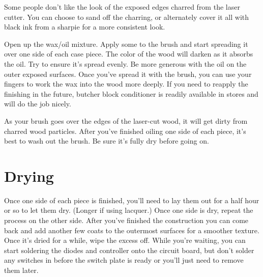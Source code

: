 \documentclass{article}
\begin{document}
\vspace{1em}

Some people don't like the look of the exposed edges charred from the
laser cutter. You can choose to sand off the charring, or alternately
cover it all with black ink from a sharpie for a more consistent look.

\vspace{1em}

Open up the wax/oil mixture. Apply some to the brush and start
spreading it over one side of each case piece. The color of the wood
will darken as it absorbs the oil. Try to ensure it's spread
evenly. Be more generous with the oil on the outer exposed
surfaces. Once you've spread it with the brush, you can use your
fingers to work the wax into the wood more deeply. If you need to
reapply the finishing in the future, butcher block conditioner is
readily available in stores and will do the job nicely.

\vspace{1em}
\noindent{}
\vspace{1em}

As your brush goes over the edges of the laser-cut wood, it will get
dirty from charred wood particles. After you've finished oiling one
side of each piece, it's best to wash out the brush. Be sure it's
fully dry before going on.

\section{Drying}

Once one side of each piece is finished, you'll need to lay them out
for a half hour or so to let them dry. (Longer if using lacquer.) Once
one side is dry, repeat the process on the other side. After you've
finished the construction you can come back and add another few coats
to the outermost surfaces for a smoother texture. Once it's dried for
a while, wipe the excess off. While you're waiting, you can start
soldering the diodes and controller onto the circuit board, but don't
solder any switches in before the switch plate is ready or you'll just
need to remove them later.
\end{document}
